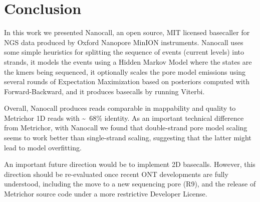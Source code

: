 \documentclass{bioinfo}
\begin{document}


%
%

\section{Conclusion}

In this work we presented Nanocall, an open source, MIT licensed basecaller for NGS data produced by Oxford Nanopore MinION instruments. Nanocall uses some simple heuristics for splitting the sequence of events (current levels) into strands, it models the events using a Hidden Markov Model where the states are the kmers being sequenced, it optionally scales the pore model emissions using several rounds of Expectation Maximization based on posteriors computed with Forward-Backward, and it produces basecalls by running Viterbi.

Overall, Nanocall produces reads comparable in mappability and quality to Metrichor 1D reads with \sim~68\% identity. As an important technical difference from Metrichor, with Nanocall we found that double-strand pore model scaling seems to work better than single-strand scaling, suggesting that the latter might lead to model overfitting.

An important future direction would be to implement 2D basecalls. However, this direction should be re-evaluated once recent ONT developments are fully understood, including the move to a new sequencing pore (R9), and the release of Metrichor source code under a more restrictive Developer License.
\end{document}
